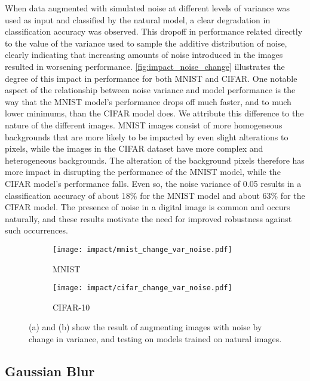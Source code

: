 \documentclass[conference]{IEEEtran}
\begin{document}
When data augmented with simulated noise at different levels of variance was used as input and classified by the natural model, a clear degradation in classification accuracy was observed. This dropoff in performance related directly to the value of the variance used to sample the additive distribution of noise, clearly indicating that increasing amounts of noise introduced in the images resulted in worsening performance. \autoref{fig:impact_noise_change} illustrates the degree of this impact in performance for both MNIST and CIFAR. One notable aspect of the relationship between noise variance and model performance is the way that the MNIST model’s performance drops off much faster, and to much lower minimums, than the CIFAR model does. We attribute this difference to the nature of the different images. MNIST images consist of more homogeneous backgrounds that are more likely to be impacted by even slight alterations to pixels, while the images in the CIFAR dataset have more complex and heterogeneous backgrounds. The alteration of the background pixels therefore has more impact in disrupting the performance of the MNIST model, while the CIFAR model’s performance falls. Even so, the noise variance of 0.05 results in a classification accuracy of about 18\% for the MNIST model and about 63\% for the CIFAR model. The presence of noise in a digital image is common and occurs naturally, and these results motivate the need for improved robustness against such occurrences.

\begin{figure}[H]
    \centering
    \begin{subfigure}{0.45\columnwidth}
        \centering
        \texttt{[image: impact/mnist\_change\_var\_noise.pdf]}
        \caption{MNIST}
    \end{subfigure}
    \begin{subfigure}{0.45\columnwidth}
        \centering
        \texttt{[image: impact/cifar\_change\_var\_noise.pdf]}
        \caption{CIFAR-10}
    \end{subfigure}
    \captionsetup{width=0.90\columnwidth}
    \caption{(a) and (b) show the result of augmenting images with noise by change in variance, and testing on models trained on natural images.}
    \label{fig:impact_noise_change}
\end{figure}

\subsection{Gaussian Blur}
\end{document}
